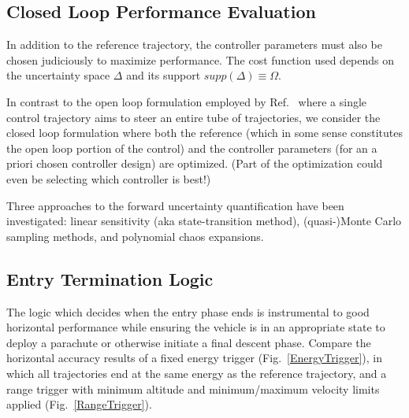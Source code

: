 \documentclass[10pt,a4paper]{article}
\begin{document}
	\subsection{Closed Loop Performance Evaluation}		
	In addition to the reference trajectory, the controller parameters must also be chosen judiciously to maximize performance. The cost function used depends on the uncertainty space $ \Delta $ and its support $supp(\Delta)\equiv\Omega$.		
			
	In contrast to the open loop formulation employed by Ref.~\cite{RSOptimalControl} where a single control trajectory aims to steer an entire tube of trajectories, we consider the closed loop formulation where both the reference (which in some sense constitutes the open loop portion of the control) and the controller parameters (for an a priori chosen controller design) are optimized. (Part of the optimization could even be selecting which controller is best!)		
	
	Three approaches to the forward uncertainty quantification have been investigated: linear sensitivity (aka state-transition method), (quasi-)Monte Carlo sampling methods, and polynomial chaos expansions.  
			
	\subsection{Entry Termination Logic}
	The logic which decides when the entry phase ends is instrumental to good horizontal performance while ensuring the vehicle is in an appropriate state to deploy a parachute or otherwise initiate a final descent phase. Compare the horizontal accuracy results of a fixed energy trigger (Fig.~\ref{EnergyTrigger}), in which all trajectories end at the same energy as the reference trajectory, and a range trigger with minimum altitude and minimum/maximum velocity limits applied (Fig.~\ref{RangeTrigger}). 
	
	
\end{document}
